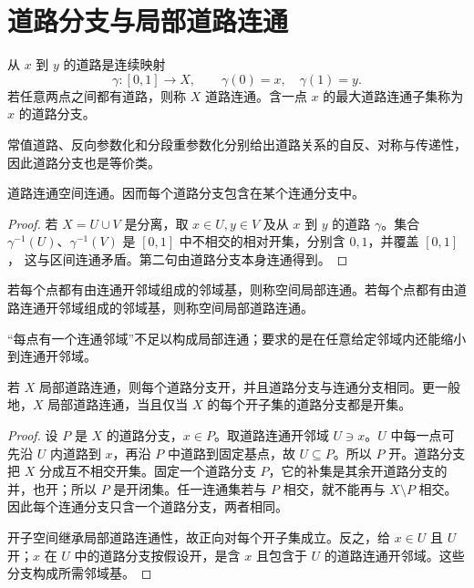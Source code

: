 \section{道路分支与局部道路连通}

\begin{definition}[道路与道路连通]
从 \(x\) 到 \(y\) 的道路是连续映射
\[
 \gamma:[0,1]\to X,\qquad \gamma(0)=x,\quad\gamma(1)=y.
\]
若任意两点之间都有道路，则称 \(X\) 道路连通。含一点 \(x\) 的最大道路连通子集称为 \(x\) 的道路分支。
\end{definition}

常值道路、反向参数化和分段重参数化分别给出道路关系的自反、对称与传递性，因此道路分支也是等价类。

\begin{proposition}
\label{prop:path-connected-implies-connected}
道路连通空间连通。因而每个道路分支包含在某个连通分支中。
\end{proposition}

\begin{proof}
若 \(X=U\cup V\) 是分离，取 \(x\in U,y\in V\) 及从 \(x\) 到 \(y\)
的道路 \(\gamma\)。集合 \(\gamma^{-1}(U)\)、\(\gamma^{-1}(V)\) 是
\([0,1]\) 中不相交的相对开集，分别含 \(0,1\)，并覆盖 \([0,1]\)，
这与区间连通矛盾。第二句由道路分支本身连通得到。
\end{proof}

\begin{definition}[局部连通与局部道路连通]
若每个点都有由连通开邻域组成的邻域基，则称空间局部连通。若每个点都有由道路连通开邻域组成的邻域基，则称空间局部道路连通。
\end{definition}

“每点有一个连通邻域”不足以构成局部连通；要求的是在任意给定邻域内还能缩小到连通开邻域。

\begin{theorem}[局部道路连通空间的分支]
\label{thm:locally-path-connected-components}
若 \(X\) 局部道路连通，则每个道路分支开，并且道路分支与连通分支相同。更一般地，\(X\) 局部道路连通，当且仅当 \(X\) 的每个开子集的道路分支都是开集。
\end{theorem}

\begin{proof}
设 \(P\) 是 \(X\) 的道路分支，\(x\in P\)。取道路连通开邻域 \(U\ni x\)。\(U\) 中每一点可先沿 \(U\) 内道路到 \(x\)，再沿 \(P\) 中道路到固定基点，故 \(U\subseteq P\)。所以 \(P\) 开。道路分支把 \(X\) 分成互不相交开集。固定一个道路分支 \(P\)，它的补集是其余开道路分支的并，也开；所以 \(P\) 是开闭集。任一连通集若与 \(P\) 相交，就不能再与 \(X\setminus P\) 相交。因此每个连通分支只含一个道路分支，两者相同。

开子空间继承局部道路连通性，故正向对每个开子集成立。反之，给 \(x\in U\) 且 \(U\) 开；\(x\) 在 \(U\) 中的道路分支按假设开，是含 \(x\) 且包含于 \(U\) 的道路连通开邻域。这些分支构成所需邻域基。
\end{proof}

